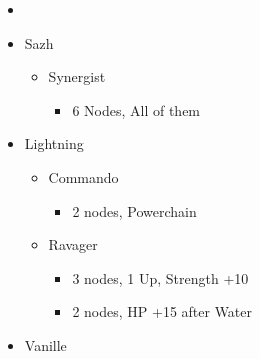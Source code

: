 \newpage
\renewcommand{\first}{[1] Relentless Assault (\rav/\com/\rav)}
\renewcommand{\second}{[2] Bully (\syn/\com/\sab)}
\renewcommand{\third}{[3] Relentless Assault (\rav/\com/\rav)}
\renewcommand{\fourth}{[4] Smart Bomb (\rav/\rav/\sab)}
\renewcommand{\fifth}{[5] Tri-Disaster (\rav/\rav/\rav)}
\renewcommand{\sixth}{[6] Malevolence (\syn/\rav/\rav)}
\begin{multicols}{2}
\begin{menu}
\begin{itemize}
    \paradigm
    \begin{itemize}
        \item {}%
{\paradigmline{\rav}{\com}{\rav}}%
{\paradigmline{\syn}{\com}{\sab}}%
{\paradigmline{\rav}{\com}{(\rav)}}%
{\paradigmline[4]{\textit{\rav}}{\textit{\rav}}{\textit{\sab}}}%
{\paradigmline{\rav}{[\rav]}{\rav}}%
{\paradigmline{[\syn]}{[\rav]}{\rav}}
    \end{itemize}
    \columnbreak
    \crystarium
    \begin{itemize}
        \item Sazh
        \begin{itemize}
            \item Synergist
            \begin{itemize}
                \item 6 Nodes, All of them
            \end{itemize}
        \end{itemize}
        \item Lightning
        \begin{itemize}
            \item Commando
            \begin{itemize}
                \item 2 nodes, Powerchain
            \end{itemize}
            \item Ravager
            \begin{itemize}
                \item 3 nodes, 1 Up, Strength +10
                \item 2 nodes, HP +15 after Water
            \end{itemize}
        \end{itemize}
        \item Vanille
        \begin{itemize}

\end{itemize}
\end{itemize}
\end{itemize}
\end{menu}
\end{multicols}
